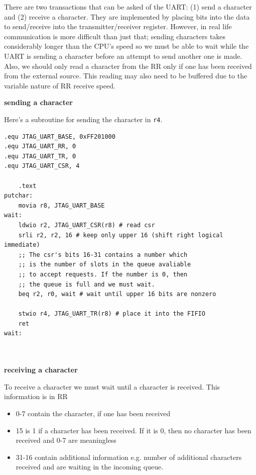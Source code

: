 \documentclass[../notes.tex]{subfiles}
\begin{document}
There are two transactions that can be asked of the UART: (1) send a character and (2) receive a character.
They are implemented by placing bits into the data to send/receive into the transmitter/receiver register.
However, in real life communication is more difficult than just that; sending characters takes considerably longer than the CPU's speed so we must be able to wait while the UART is sending a character before an attempt to send another one is made. Also, we should only read a character from the RR only if one has been received from the external source. This reading may also need to be buffered due to the variable nature of RR receive speed.


\textbf{sending a character}  

Here's a subroutine for sending the character in \texttt{r4}. 


\begin{listing}[H]
\begin{verbatim}
.equ JTAG_UART_BASE, 0xFF201000
.equ JTAG_UART_RR, 0
.equ JTAG_UART_TR, 0
.equ JTAG_UART_CSR, 4

	.text
putchar:
	movia r8, JTAG_UART_BASE
wait:
	ldwio r2, JTAG_UART_CSR(r8) # read csr
	srli r2, r2, 16 # keep only upper 16 (shift right logical immediate)
	;; The csr's bits 16-31 contains a number which
	;; is the number of slots in the queue avaliable 
	;; to accept requests. If the number is 0, then
	;; the queue is full and we must wait.
	beq r2, r0, wait # wait until upper 16 bits are nonzero

	stwio r4, JTAG_UART_TR(r8) # place it into the FIFIO
	ret
wait:



\end{verbatim}
\end{listing}


\textbf{receiving a character}

To receive a character we must wait until a character is received. This information is in RR

\begin{itemize}
	\item 0-7 contain the character, if one has been received
	\item 15 is 1 if a character has been received. If it is 0, then no character has been received and 0-7 are meaningless
	\item 31-16 contain additional information e.g. number of additional characters received and are waiting in the incoming queue.
\end{itemize}
\end{document}
